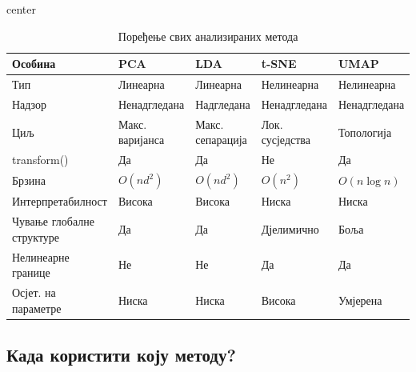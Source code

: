 \documentclass{article}
\begin{document}
	\begin{table}[h]
		\centering
		\begin{adjustbox}{center}
			\begin{tabular}{|p{3.5cm}|p{2.3cm}|p{2.3cm}|p{2.3cm}|p{2.3cm}|}
				\hline
				\textbf{Особина} & \textbf{PCA} & \textbf{LDA} & \textbf{t-SNE} & \textbf{UMAP} \\
				\hline
				Тип & Линеарна & Линеарна & Нелинеарна & Нелинеарна \\
				\hline
				Надзор & Ненадгледана & Надгледана & Ненадгледана & Ненадгледана \\
				\hline
				Циљ & Макс. варијанса & Макс. сепарација & Лок. сусједства & Топологија \\
				\hline
				transform() & Да & Да & Не & Да \\
				\hline
				Брзина  & $O(nd^2)$ & $O(nd^2)$ & $O(n^2)$ & $O(n\log n)$ \\
				\hline
				Интерпретабилност & Висока & Висока & Ниска & Ниска \\
				\hline
				Чување глобалне структуре & Да & Да & Дјелимично & Боља \\
				\hline
				Нелинеарне границе & Не & Не & Да & Да \\
				\hline
				Осјет. на параметре & Ниска & Ниска & Висока & Умјерена \\
				\hline
			\end{tabular}
		\end{adjustbox}
		\caption{Поређење свих анализираних метода}
		\label{tab:poredenje}
	\end{table}
	
	
	\subsection{Када користити коју методу?}
	
\end{document}
